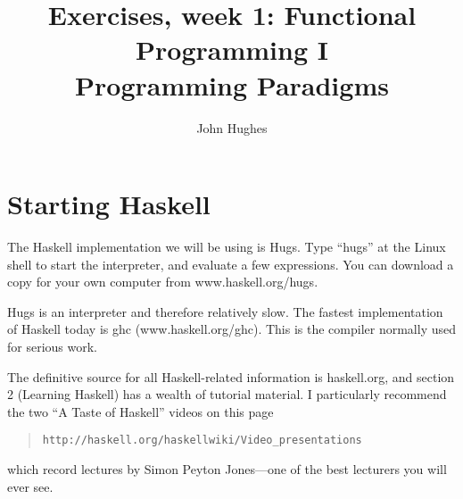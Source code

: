 \documentclass{article}
\begin{document}
\title{Exercises, week 1: Functional Programming I\\
  \large Programming Paradigms}
\author{John Hughes}
\maketitle

\newcommand{\answer}[1]{\begin{quote}{\bf Answer:} #1\end{quote}}
\newcommand{\percent}[1]{}

\section{Starting Haskell}
\percent{0}
The Haskell implementation we will be using is Hugs. Type ``hugs''
at the Linux shell to start the interpreter, and evaluate a few
expressions. You can download a copy for your own computer from
www.haskell.org/hugs.

Hugs is an interpreter and therefore relatively slow. The fastest
implementation of Haskell today is ghc (www.haskell.org/ghc). This is
the compiler normally used for serious work. 

The definitive source for all Haskell-related information is
haskell.org, and section 2 (Learning Haskell) has a wealth of tutorial
material. I particularly recommend the two ``A Taste of Haskell''
videos on this page
\begin{quote}
\verb!http://haskell.org/haskellwiki/Video_presentations!
\end{quote}
which record
lectures by Simon Peyton Jones---one of the best lecturers you will
ever see.
\end{document}
